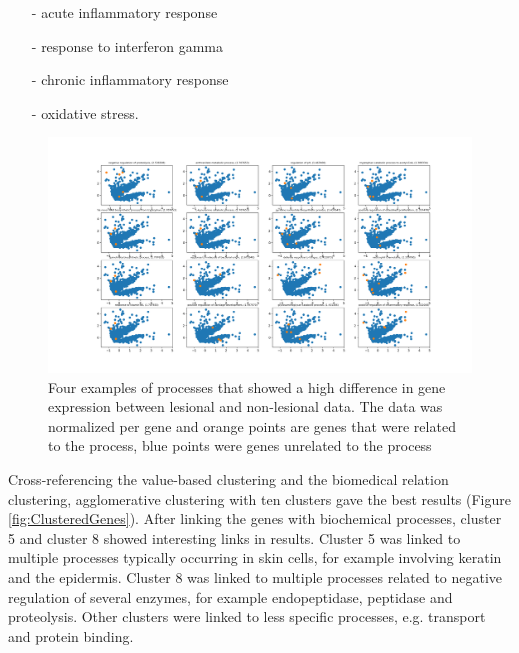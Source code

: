 \documentclass[10pt,a4paper]{article}
\begin{document}
	\begin{enumerate}
		\item[-] acute inflammatory response
		\item[-] response to interferon gamma 
		\item[-] chronic inflammatory response
		\item[-] oxidative stress.
	\end{enumerate}
	
	\begin{figure}[H]
	\includegraphics[width=1\textwidth]{Sign_Processes_Psoriasis.png}
	\caption{Four examples of processes that showed a high difference in gene expression between lesional and non-lesional data. The data was normalized per gene and orange points are genes that were related to the process, blue points were genes unrelated to the process}
	\label{fig:ProcessesScaledBySample}
\end{figure}	
	
	Cross-referencing the value-based clustering and the biomedical relation clustering, agglomerative clustering with ten clusters gave the best results (Figure \ref{fig:ClusteredGenes}). After linking the genes with biochemical processes, cluster 5 and cluster 8 showed interesting links in results. Cluster 5 was linked to multiple processes typically occurring in skin cells, for example involving keratin and the epidermis. Cluster 8 was linked to multiple processes related to negative regulation of several enzymes, for example endopeptidase, peptidase and proteolysis. Other clusters were linked to less specific processes, e.g. transport and protein binding.
	
\end{document}

